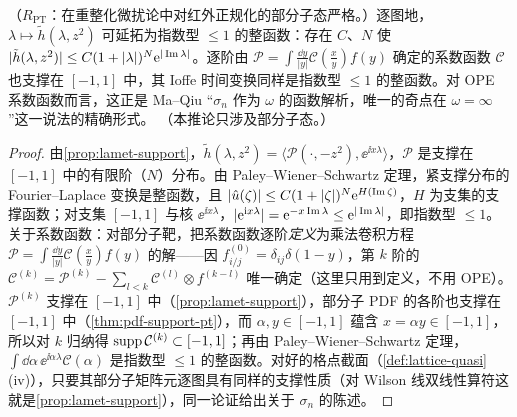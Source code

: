 \begin{corollary}\label{cor:lamet-entire}
（$R_{\mathrm{PT}}$：在重整化微扰论中对红外正规化的部分子态严格。）逐图地，$\lambda\mapsto\tilde h(\lambda,z^2)$ 可延拓为指数型 $\le1$ 的整函数：存在 $C$、$N$ 使 $|\tilde h(\lambda,z^2)|\le C(1+|\lambda|)^N\mathrm{e}^{|\operatorname{Im}\lambda|}$。逐阶由 $\mathcal P=\int\frac{\dd y}{|y|}\mathcal C(\frac xy)f(y)$ 确定的系数函数 $\mathcal C$ 也支撑在 $[-1,1]$ 中，其 Ioffe 时间变换同样是指数型 $\le1$ 的整函数。对 OPE 系数函数而言，这正是 Ma--Qiu “$\sigma_n$ 作为 $\omega$ 的函数解析，唯一的奇点在 $\omega=\infty$”\cite{MaQiu2018}这一说法的精确形式。
（本推论只涉及部分子态。）
\end{corollary}

\begin{proof}
由\cref{prop:lamet-support}，$\tilde h(\lambda,z^2)=\langle\mathcal P(\cdot,-z^2),\ee^{\ii x\lambda}\rangle$，$\mathcal P$ 是支撑在 $[-1,1]$ 中的有限阶（$N$）分布。由 Paley--Wiener--Schwartz 定理\cite[定理~7.3.1]{Hormander2003}，紧支撑分布的 Fourier--Laplace 变换是整函数，且 $|\hat u(\zeta)|\le C(1+|\zeta|)^N\mathrm{e}^{H(\operatorname{Im}\zeta)}$，$H$ 为支集的支撑函数；对支集 $[-1,1]$ 与核 $\ee^{\ii x\lambda}$，$|\mathrm{e}^{\mathrm{i} x\lambda}|=\mathrm{e}^{-x\operatorname{Im}\lambda}\le\mathrm{e}^{|\operatorname{Im}\lambda|}$，即指数型 $\le1$。关于系数函数：对部分子靶，把系数函数逐阶\emph{定义}为乘法卷积方程 $\mathcal P=\int\frac{\dd y}{|y|}\mathcal C(\frac xy)f(y)$ 的解——因 $f^{(0)}_{i/j}=\delta_{ij}\delta(1-y)$，第 $k$ 阶的 $\mathcal C^{(k)}=\mathcal P^{(k)}-\sum_{l<k}\mathcal C^{(l)}\otimes f^{(k-l)}$ 唯一确定（这里只用到定义，不用 OPE）。$\mathcal P^{(k)}$ 支撑在 $[-1,1]$ 中（\cref{prop:lamet-support}），部分子 PDF 的各阶也支撑在 $[-1,1]$ 中（\cref{thm:pdf-support-pt}），而 $\alpha,y\in[-1,1]$ 蕴含 $x=\alpha y\in[-1,1]$，所以对 $k$ 归纳得 ${\rm supp}\,\mathcal C^{(k)}\subset[-1,1]$；再由 Paley--Wiener--Schwartz 定理，$\int\dd\alpha\,\ee^{\ii\alpha\lambda}\mathcal C(\alpha)$ 是指数型 $\le1$ 的整函数。对好的格点截面（\cref{def:lattice-quasi}(iv)），只要其部分子矩阵元逐图具有同样的支撑性质（对 Wilson 线双线性算符这就是\cref{prop:lamet-support}），同一论证给出关于 $\sigma_n$ 的陈述。
\end{proof}


